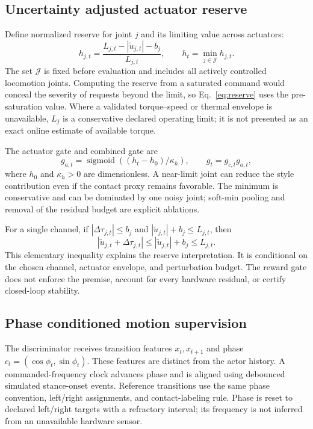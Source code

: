 \documentclass[11pt,a4paper]{article}
\newcommand{\sigmoid}{\operatorname{sigmoid}}
\begin{document}
\subsection{Uncertainty adjusted actuator reserve}
Define normalized reserve for joint $j$ and its limiting value across actuators:
\begin{equation}
 h_{j,t}=\frac{L_{j,t}-|\tilde u_{j,t}|-b_j}{L_{j,t}},\qquad
 h_t=\min_{j\in\mathcal J}h_{j,t}.
 \label{eq:reserve}
\end{equation}
The set $\mathcal J$ is fixed before evaluation and includes all actively controlled locomotion joints. Computing the reserve from a saturated command would conceal the severity of requests beyond the limit, so Eq.~\eqref{eq:reserve} uses the pre-saturation value. Where a validated torque--speed or thermal envelope is unavailable, $L_j$ is a conservative declared operating limit; it is not presented as an exact online estimate of available torque.

The actuator gate and combined gate are
\begin{equation}
 g_{a,t}=\sigmoid((h_t-h_0)/\kappa_h),\qquad g_t=g_{c,t}g_{a,t},
 \label{eq:gate}
\end{equation}
where $h_0$ and $\kappa_h>0$ are dimensionless. A near-limit joint can reduce the style contribution even if the contact proxy remains favorable. The minimum is conservative and can be dominated by one noisy joint; soft-min pooling and removal of the residual budget are explicit ablations.

For a single channel, if $|\Delta\tau_{j,t}|\leq b_j$ and $|\tilde u_{j,t}|+b_j\leq L_{j,t}$, then
\begin{equation}
 |\tilde u_{j,t}+\Delta\tau_{j,t}|\leq |\tilde u_{j,t}|+b_j\leq L_{j,t}.
\end{equation}
This elementary inequality explains the reserve interpretation. It is conditional on the chosen channel, actuator envelope, and perturbation budget. The reward gate does not enforce the premise, account for every hardware residual, or certify closed-loop stability.

\subsection{Phase conditioned motion supervision}
The discriminator receives transition features $x_t,x_{t+1}$ and phase $c_t=(\cos\phi_t,\sin\phi_t)$. These features are distinct from the actor history. A commanded-frequency clock advances phase and is aligned using debounced simulated stance-onset events. Reference transitions use the same phase convention, left/right assignments, and contact-labeling rule. Phase is reset to declared left/right targets with a refractory interval; its frequency is not inferred from an unavailable hardware sensor.
\end{document}
